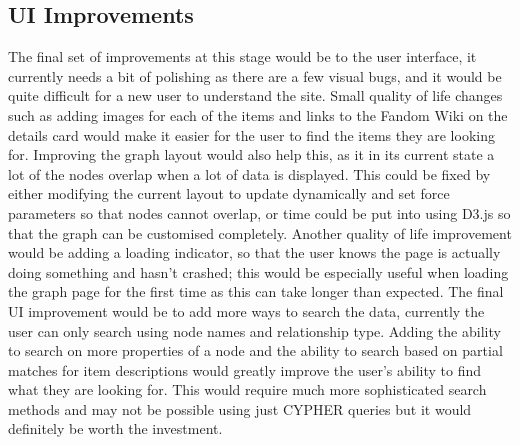 \subsection*{UI Improvements}
The final set of improvements at this stage would be to the user interface, it currently needs a bit of polishing as there are a few visual bugs, and 
it would be quite difficult for a new user to understand the site. Small quality of life changes such as adding images for each of the items and links to 
the Fandom Wiki on the details card would make it easier for the user to find the items they are looking for. Improving the graph layout would also help this, as 
it in its current state a lot of the nodes overlap when a lot of data is displayed. This could be fixed by either modifying the current layout to update dynamically 
and set force parameters so that nodes cannot overlap, or time could be put into using D3.js so that the graph can be customised completely. Another quality of life 
improvement would be adding a loading indicator, so that the user knows the page is actually doing something and hasn't crashed; this would be especially useful when loading 
the graph page for the first time as this can take longer than expected. The final UI improvement would be to add more ways to search the data, currently the user can 
only search using node names and relationship type. Adding the ability to search on more properties of a node and the ability to search based on partial matches for item descriptions would 
greatly improve the user's ability to find what they are looking for. This would require much more sophisticated search methods and may not be possible using just CYPHER queries but 
it would definitely be worth the investment.
